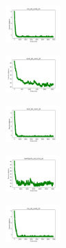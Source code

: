 \begin{figure}[H]
    \centering
    \begin{subfigure}
        \centering
        \includegraphics[width=0.234\textwidth]{img/am01/iris_set_const_20_949004259_cost.png}
    \end{subfigure}
    \hfill
    \begin{subfigure}
        \centering
        \includegraphics[width=0.234\textwidth]{img/am01/ecoli_set_const_20_949004259_cost.png}
    \end{subfigure}
    \hfill
    \begin{subfigure}
        \centering
        \includegraphics[width=0.234\textwidth]{img/am01/rand_set_const_20_949004259_cost.png}
    \end{subfigure}
    \hfill
    \begin{subfigure}
        \centering
        \includegraphics[width=0.234\textwidth]{img/am01/newthyroid_set_const_20_949004259_cost.png}
    \end{subfigure}
    \hfill
    \begin{subfigure}
        \centering
        \includegraphics[width=0.234\textwidth]{img/am01/iris_set_const_20_589741062_cost.png}
    \end{subfigure}
    \hfill

\end{figure}
